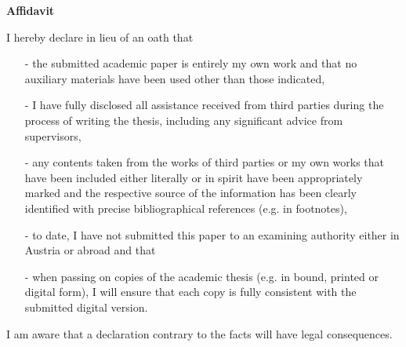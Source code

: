 {\Large
\noindent
{\bf Affidavit}} \\
\vspace*{0.3 cm}

\noindent
I hereby declare in lieu of an oath that
\begin{itemize}
    \item[-] the submitted academic paper is entirely my own work and that no auxiliary materials have been used other than those indicated,
    \item[-] I have fully disclosed all assistance received from third parties during the process of writing the thesis, including any significant advice from supervisors,
    \item[-] any contents taken from the works of third parties or my own works that have been included either literally or in spirit have been appropriately marked and the respective source of the information has been clearly identified with precise bibliographical references (e.g. in footnotes),
    \item[-] to date, I have not submitted this paper to an examining authority either in Austria or abroad and that
    \item[-] when passing on copies of the academic thesis (e.g. in bound, printed or digital form), I will ensure that each copy is fully consistent with the submitted digital version.
\end{itemize}

\noindent
I am aware that a declaration contrary to the facts will have legal consequences.\\\\\\\\

\noindent
\begin{table}[H]
\end{table}